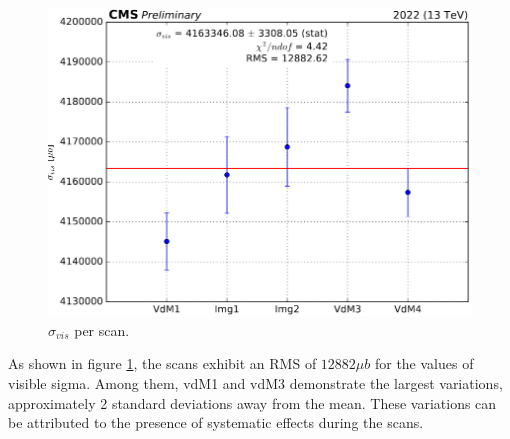 \begin{center}
  \begin{figure}[ht]
    \centering
    \includegraphics[scale=0.45]{Chapter4/xsec_perscan_v2.png}
    \caption[$\sigma_{vis}$ per Scan]{ $\sigma_{vis}$  per scan.} 
    \label{sigmavis_perscan}
  \end{figure}
\end{center}

As shown in figure \ref{sigmavis_perscan}, the scans exhibit an RMS of $12882 \mu b$ for the values of visible sigma. Among them, vdM1 and vdM3 demonstrate the largest variations, approximately 2 standard deviations away from the mean. These variations can be attributed to the presence of systematic effects during the scans.
